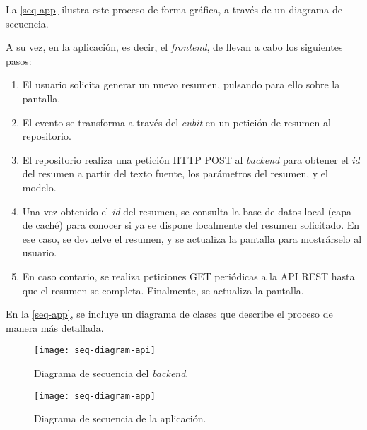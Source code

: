 La \autoref{seq-app} ilustra este proceso de forma gráfica, a través de un diagrama de secuencia.

A su vez, en la aplicación, es decir, el \emph{frontend}, de llevan a cabo los siguientes pasos:

\begin{enumerate}
	\item El usuario solicita generar un nuevo resumen, pulsando para ello sobre la pantalla.
	
	\item El evento se transforma a través del \emph{cubit} en un petición de resumen al repositorio.
	
	\item El repositorio realiza una petición HTTP POST al \emph{backend} para obtener el \emph{id} del resumen a partir del texto fuente, los parámetros del resumen, y el modelo.
	
	\item Una vez obtenido el \emph{id} del resumen, se consulta la base de datos local (capa de caché) para conocer si ya se dispone localmente del resumen solicitado. En ese caso, se devuelve el resumen, y se actualiza la pantalla para mostrárselo al usuario.
	
	\item En caso contario, se realiza peticiones GET periódicas a la API REST hasta que el resumen se completa. Finalmente, se actualiza la pantalla.
\end{enumerate}

En la \autoref{seq-app}, se incluye un diagrama de clases que describe el proceso de manera más detallada.

\vspace{1cm}

\begin{figure}[h]
	\centering
	\texttt{[image: seq-diagram-api]}
	\caption{Diagrama de secuencia del \emph{backend}.}
	\label{seq-api}
\end{figure}

\vspace*{1cm}

\begin{landscape}
	\begin{figure}[h]
		\centering
		\texttt{[image: seq-diagram-app]}
		\caption{Diagrama de secuencia de la aplicación.}
		\label{seq-app}
	\end{figure}
\end{landscape}


